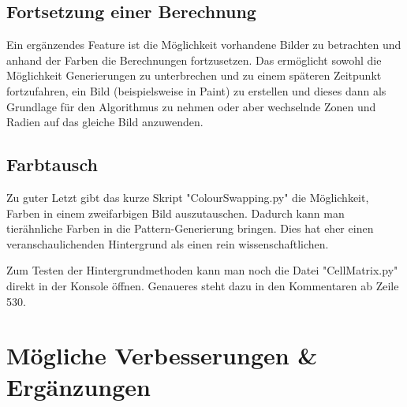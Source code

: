 \documentclass[]{article}
\begin{document}
\subsection{Fortsetzung einer Berechnung}
Ein erg\"anzendes Feature ist die M\"oglichkeit vorhandene Bilder zu betrachten und anhand der Farben die Berechnungen fortzusetzen. Das erm\"oglicht sowohl die M\"oglichkeit Generierungen zu unterbrechen und  zu einem sp\"ateren Zeitpunkt fortzufahren, ein Bild (beispielsweise in Paint) zu erstellen und dieses dann als Grundlage f\"ur den Algorithmus zu nehmen oder aber wechselnde Zonen und Radien auf das gleiche Bild anzuwenden.

\subsection{Farbtausch}
Zu guter Letzt gibt das kurze Skript "ColourSwapping.py" die M\"oglichkeit, Farben in einem zweifarbigen Bild auszutauschen. Dadurch kann man tier\"ahnliche Farben in die Pattern-Generierung bringen. Dies hat eher einen veranschaulichenden Hintergrund als einen rein wissenschaftlichen. \\


\begin{figure}[h]
	\begin{center}
		\hspace{50pt}
	\end{center}
\end{figure}


Zum Testen der Hintergrundmethoden kann man noch die Datei "CellMatrix.py" direkt in der Konsole \"offnen. Genaueres steht dazu in den Kommentaren ab Zeile 530.

\section{M\"ogliche Verbesserungen \& Erg\"anzungen}
\end{document}
